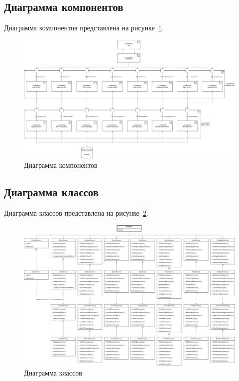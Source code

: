 \subsection{Диаграмма компонентов}

Диаграмма компонентов представлена на рисунке~\ref{fig:components-diagram}.

\begin{figure}[h]
	\centering
	\includegraphics[width=1\textwidth]{images/uml-components.png}
	\caption{Диаграмма компонентов} 
	\label{fig:components-diagram} 
\end{figure}

\newpage

\subsection{Диаграмма классов}

Диаграмма классов представлена на рисунке~\ref{fig:class-diagram}.

\begin{figure}[H]
	\centering
	\includegraphics[width=1\textwidth]{images/uml-classes.png}
	\caption{Диаграмма классов} 
	\label{fig:class-diagram} 
\end{figure}

